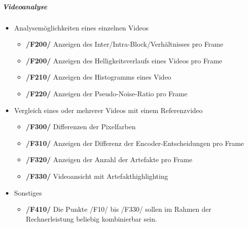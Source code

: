 \subparagraph{Videoanalyse}
\begin{itemize}
        \item Analysemöglichkeiten eines einzelnen Videos  
                \begin{itemize}
                        \item \textbf{/F200/} Anzeigen des Inter/Intra-Block/Verhältnisses pro Frame
                        \item \textbf{/F200/} Anzeigen des Helligkeitsverlaufs eines Videos pro Frame
                        \item \textbf{/F210/} Anzeigen des Histogramms eines Video
                        \item \textbf{/F220/} Anzeigen der Pseudo-Noise-Ratio pro Frame
                   \end{itemize}
        \item Vergleich eines oder mehrerer Videos mit einem Referenzvideo
                \begin{itemize}
                        \item \textbf{/F300/} Differenzen der Pixelfarben %
                        \item \textbf{/F310/} Anzeigen der Differenz der Encoder-Entscheidungen pro Frame
                        \item \textbf{/F320/} Anzeigen der Anzahl der Artefakte pro Frame
                        \item \textbf{/F330/} Videoansicht mit Artefakthighlighting
                \end{itemize}  
        \item Sonstiges
                \begin{itemize}
                        \item \textbf{/F410/} Die Punkte /F10/ bis /F330/ sollen im Rahmen der Rechnerleistung beliebig kombinierbar sein.
                \end{itemize}
\end{itemize}
 

